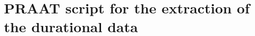 \documentclass[11pt,a4paper,oneside,openany]{memoir}\usepackage[]{graphicx}\usepackage[]{color}
\begin{document}
\appendix





\chapter{PRAAT script for the extraction of the durational data}
\label{a:getmeasure}









\end{document}

